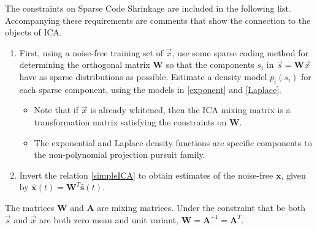 \documentclass[12pt ]{article}
\begin{document}
The constraints on Sparse Code Shrinkage are included in the following list.  Accompanying these requirements are comments that show the connection to the objects of ICA. 
\begin{enumerate}
\item First, using a noise-free training set of $\vec{x}$, use some sparse coding method for determining the orthogonal matrix $\mathbf{W}$ so that the components $s_i$ in $\vec{s} = \mathbf{W}\vec{x}$ have as sparse distributions as possible.  Estimate a density model $p_i (s_i)$ for each sparse component, using the models in \ref{exponent} and \ref{Laplace}.
\begin{itemize}
	\item Note that if $\vec{x}$ is already whitened, then the ICA mixing matrix is a transformation matrix satisfying the constraints on $\mathbf{W}$.
	\item The exponential and Laplace density functions are specific components to the non-polynomial projection pursuit family. 
\end{itemize}


\item Invert the relation \ref{simpleICA} to obtain estimates of the noise-free $\mathbf{x}$, given by $\mathbf{\hat{x}}(t) = \mathbf{W}^T \hat{\mathbf{s}}(t)$.
\end{enumerate}
The matrices $\mathbf{W}$ and $\mathbf{A}$ are mixing matrices.  Under the constraint that be both $\vec{s}$ and $\vec{x}$ are both zero mean and unit variant, $\mathbf{W}= \mathbf{A}^{-1} = \mathbf{A}^T$.
\end{document}
